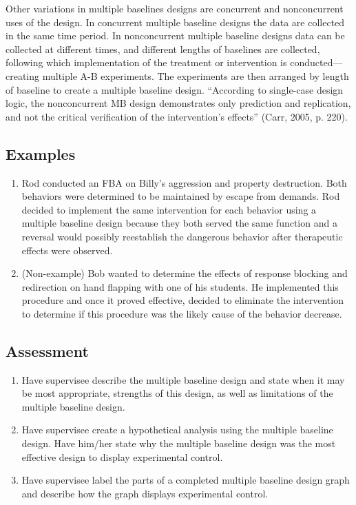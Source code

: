 Other variations in multiple baselines designs are concurrent and nonconcurrent uses of the design. In concurrent multiple baseline designs the data are collected in the same time period. In nonconcurrent multiple baseline designs data can be collected at different times, and different lengths of baselines are collected, following which implementation of the treatment or intervention is conducted—creating multiple A-B experiments. The experiments are then arranged by length of baseline to create a multiple baseline design.  ``According to single-case design logic, the nonconcurrent MB design demonstrates only prediction and replication, and not the critical verification of the intervention's effects'' (Carr, 2005, p. 220).

\subsection{Examples}
\begin{enumerate}
\item Rod conducted an FBA on Billy's aggression and property destruction. Both behaviors were determined to be maintained by escape from demands. Rod decided to implement the same intervention for each behavior using a multiple baseline design because they both served the same function and a reversal would possibly reestablish the dangerous behavior after therapeutic effects were observed. 
\item (Non-example) Bob wanted to determine the effects of response blocking and redirection on hand flapping with one of his students. He implemented this procedure and once it proved effective, decided to eliminate the intervention to determine if this procedure was the likely cause of the behavior decrease. 
\end{enumerate}
%
\subsection{Assessment}
\begin{enumerate}
\item Have supervisee describe the multiple baseline design and state when it may be most appropriate, strengths of this design, as well as limitations of the multiple baseline design.
\item Have supervisee create a hypothetical analysis using the multiple baseline design. Have him/her state why the multiple baseline design was the most effective design to display experimental control.
\item Have supervisee label the parts of a completed multiple baseline design graph and describe how the graph displays experimental control. 
\end{enumerate}
%
